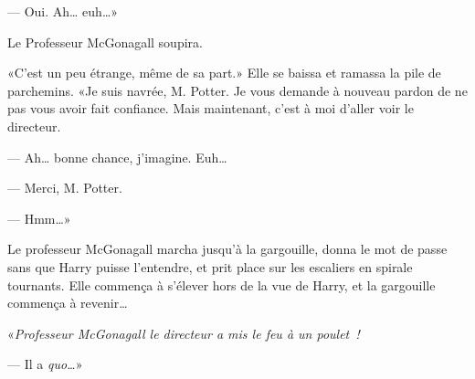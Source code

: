 --- Oui. Ah… euh…»

Le Professeur McGonagall soupira.

«C'est un peu étrange, même de sa part.» Elle se baissa et ramassa la pile de parchemins. «Je suis navrée, M. Potter. Je vous demande à nouveau pardon de ne pas vous avoir fait confiance. Mais maintenant, c'est à moi d'aller voir le directeur.

--- Ah… bonne chance, j'imagine. Euh…

--- Merci, M. Potter.

--- Hmm…»

Le professeur McGonagall marcha jusqu'à la gargouille, donna le mot de passe sans que Harry puisse l'entendre, et prit place sur les escaliers en spirale tournants. Elle commença à s'élever hors de la vue de Harry, et la gargouille commença à revenir…

«\emph{Professeur McGonagall le directeur a mis le feu à un poulet~!}

--- Il a \emph{quo…}»
